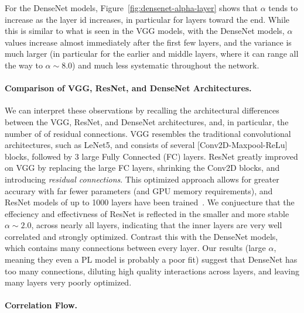 For the DenseNet models, Figure~\ref{fig:densenet-alpha-layer} shows that $\alpha$ tends to increase as the layer id increases, in particular for layers toward the end.
While this is similar to what is seen in the VGG models, with the DenseNet models, $\alpha$ values increase almost immediately after the first few layers, and the variance is much larger (in particular for the earlier and middle layers, where it can range all the way to $\alpha\sim 8.0$) and much less systematic throughout the network.

\paragraph{Comparison of VGG, ResNet, and DenseNet Architectures.}
We can interpret these observations by recalling the architectural differences between the VGG, ResNet, and DenseNet architectures,
and, in particular, the number of of residual connections. VGG resembles the  traditional convolutional architectures,
such as LeNet5, and consists of several [Conv2D-Maxpool-ReLu] blocks, followed by 3 large Fully Connected (FC) layers.
ResNet greatly improved on VGG by replacing the large FC layers, shrinking the Conv2D blocks, and introducing \emph{residual connections}.
This optimized approach allows for greater accurary with far fewer parameters (and GPU memory requirements), and
ResNet models of up to 1000 layers have been trained~\cite{resnet1000}.
We conjuecture that the effeciency and effectivness of ResNet is reflected in the smaller and more stable $\alpha\sim 2.0$, across nearly all layers, indicating that the inner layers are very well correlated and strongly optimized.
Contrast this with the DenseNet models, which contains many connections between every layer.
Our results (large $\alpha$, meaning they even a PL model is probably a poor fit) suggest that DenseNet has too many connections, diluting high quality interactions across layers, and leaving many layers very poorly optimized.


\paragraph{Correlation Flow.}


